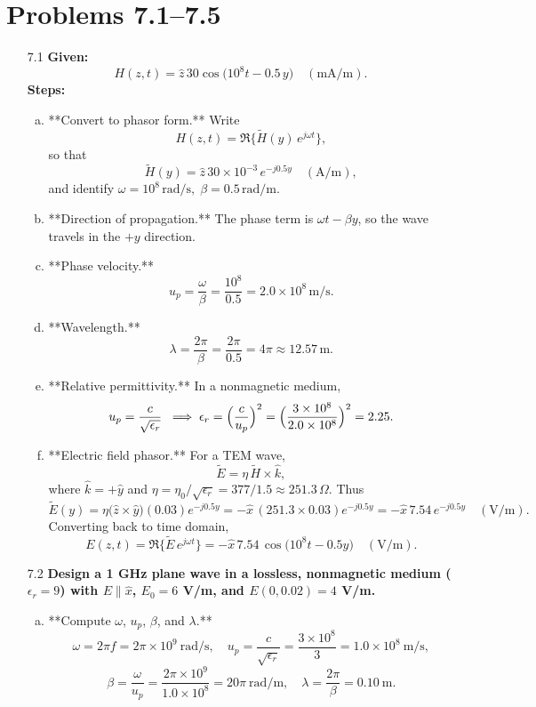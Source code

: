 \section*{Problems 7.1--7.5}
\begin{enumerate}

\item[7.1] \textbf{Given:} 
\[H(z,t)=\hat z\,30\cos\bigl(10^8 t-0.5\,y\bigr)\quad(\mathrm{mA/m}).\]
\textbf{Steps:}
\begin{enumerate}[(a)]
  \item **Convert to phasor form.**  Write
  \[H(z,t)=\Re\{\tilde H(y)\,e^{j\omega t}\},\]
  so that
  \[\tilde H(y)=\hat z\,30\times10^{-3}\,e^{-j0.5y}\quad(\mathrm{A/m}),\]
  and identify
  \(\omega=10^8\,\mathrm{rad/s},\;\beta=0.5\,\mathrm{rad/m}.\)

  \item **Direction of propagation.**  The phase term is
  \(\omega t - \beta y\), so the wave travels in the $+y$ direction.

  \item **Phase velocity.**  
  \[u_p=\frac{\omega}{\beta}=\frac{10^8}{0.5}=2.0\times10^8\,\mathrm{m/s}.\]

  \item **Wavelength.**  
  \[\lambda=\frac{2\pi}{\beta}=\frac{2\pi}{0.5}=4\pi\approx12.57\,\mathrm{m}.\]

  \item **Relative permittivity.**  In a nonmagnetic medium,
  \[u_p=\frac{c}{\sqrt{\epsilon_r}}\;\;\Longrightarrow\;
    \epsilon_r=\Bigl(\frac{c}{u_p}\Bigr)^2
    =\Bigl(\frac{3\times10^8}{2.0\times10^8}\Bigr)^2=2.25.\]

  \item **Electric field phasor.**  For a TEM wave,
  \[\tilde E = \eta\,\tilde H \times \hat k,\]
  where $\hat k=+\hat y$ and $\eta=\eta_0/\sqrt{\epsilon_r}=377/1.5\approx251.3\,\Omega$.  Thus
  \[
    \tilde E(y)
    =\eta\bigl(\hat z\times\hat y\bigr)(0.03)e^{-j0.5y}
    =-\hat x\,(251.3\times0.03)e^{-j0.5y}
    =-\hat x\,7.54\,e^{-j0.5y}\quad(\mathrm{V/m}).
  \]
  Converting back to time domain,
  \[
    E(z,t)=\Re\{\tilde E\,e^{j\omega t}\}
    =-\hat x\,7.54\,\cos\bigl(10^8t-0.5y\bigr)\quad(\mathrm{V/m}).\]
\end{enumerate}

\item[7.2] \textbf{Design a 1 GHz plane wave in a lossless, nonmagnetic medium ($\epsilon_r=9$) with $E\parallel\hat x$, $E_0=6$ V/m, and $E(0,0.02)=4$ V/m.}
\begin{enumerate}[(a)]
  \item **Compute $\omega$, $u_p$, $\beta$, and $\lambda$.**  
  \[
    \omega=2\pi f=2\pi\times10^9~\mathrm{rad/s},\quad
    u_p=\frac{c}{\sqrt{\epsilon_r}}=\frac{3\times10^8}{3}=1.0\times10^8~\mathrm{m/s},
  \]
  \[
    \beta=\frac{\omega}{u_p}=\frac{2\pi\times10^9}{1.0\times10^8}=20\pi~\mathrm{rad/m},\quad
    \lambda=\frac{2\pi}{\beta}=0.10~\mathrm{m}.
  \]


\end{enumerate}
\end{enumerate}
